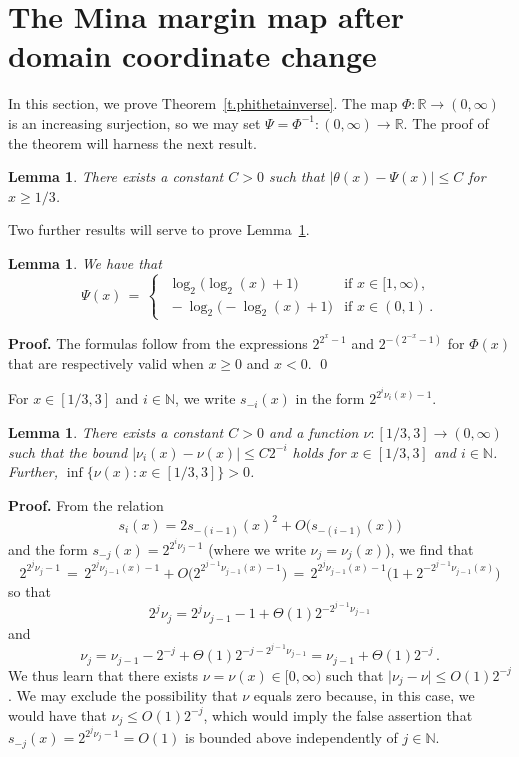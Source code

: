 \documentclass[letterpaper,11pt,oneside,reqno]{amsbook}
\newcommand{\N}{\ensuremath{\mathbb{N}}}
\newcommand{\R}{\ensuremath{\mathbb{R}}}
\numberwithin{figure}{chapter}
\newtheorem{lemma}[theorem]{Lemma}
\theoremstyle{definition}
\theoremstyle{definition}
\theoremstyle{definition}
\theoremstyle{definition}
\theoremstyle{definition}
\newcommand{\ceemack}{\nu}
\newcommand{\nwithzero}{\N}
\newcommand{\PhiMac}{\Phi}
\begin{document}
\section{The Mina margin map after domain coordinate change}\label{s.mmmtransform}
In this section, we prove Theorem~\ref{t.phithetainverse}.
The map  $\PhiMac:\R \to (0,\infty)$ is an increasing surjection, so we may set $\Psi = \PhiMac^{-1}:(0,\infty) \to \R$.
The proof of the theorem will harness the next result.
\begin{lemma}\label{l.thetapsi}
There exists a constant $C > 0$ such that $\vert \theta(x) - \Psi(x) \vert \leq C$ for $x \geq 1/3$.
\end{lemma}
Two further results will serve to prove Lemma~\ref{l.thetapsi}.
\begin{lemma}\label{l.psi}
We have that
$$ \Psi(x)\, = \, \begin{cases}
  \, \, \log_2 \big( \log_2(x) +1 \big)  &  \text{if $x \in [1,\infty)$} \, , \\
 \, \, - \log_2 \big( - \log_2(x) +1 \big)   &  \text{if $x \in (0,1)$} \, .
\end{cases}
$$
\end{lemma}
{\bf Proof.} The formulas follow from the expressions $2^{2^x - 1}$ and $2^{-(2^{-x} -1)}$ for $\PhiMac(x)$ that are respectively valid when $x \geq 0$ and $ x < 0$. \qed

For $x \in [1/3,3]$ and $i \in \nwithzero$, we write $s_{-i}(x)$ in the form $2^{2^i \ceemack_i(x) - 1}$.
\begin{lemma}\label{l.sminusi}
There exists a constant $C > 0$ and a function $\ceemack:[1/3,3] \to (0,\infty)$ such that the bound $\vert \ceemack_i(x) - \ceemack(x) \vert \leq C 2^{-i}$ holds for $x \in [1/3,3]$ and $i \in \nwithzero$. Further, $\inf \big\{ \ceemack(x): x \in [1/3,3] \big\} > 0$.
\end{lemma}
{\bf Proof.}
From the relation 
$$
s_i(x) = 2 s_{-(i-1)}(x)^2 + O \big( s_{-(i-1)}(x) \big)
$$
and the form $s_{-j}(x) = 2^{2^i \ceemack_j - 1}$ (where we write $\ceemack_j = \ceemack_j(x)$), we find that
$$
 2^{2^j \ceemack_j - 1} \, = \, 2^{2^j \ceemack_{j-1}(x) - 1} + O \big( 2^{2^{j-1} \ceemack_{j-1}(x) - 1} \big) \, = \,  2^{2^j \ceemack_{j-1}(x) - 1} \Big( 1+  2^{-2^{j-1} \ceemack_{j-1}(x)} \Big)
$$
so that
$$
2^j \ceemack_j = 2^j \ceemack_{j-1} - 1 + \Theta(1) 2^{-2^{j-1}\ceemack_{j-1}}
$$
and
$$
\ceemack_j = \ceemack_{j-1} - 2^{-j} + \Theta(1) 2^{-j - 2^{j-1}\ceemack_{j-1}} = \ceemack_{j-1} + \Theta(1) 2^{-j} \, .
$$
We thus learn that there exists $\ceemack = \ceemack(x) \in [0,\infty)$ such that $\vert \ceemack_j - \ceemack \vert \leq O(1) 2^{-j}$. We may exclude the possibility that $\ceemack$ equals zero because, in this case, we would have that $\ceemack_j \leq O(1) 2^{-j}$, which would imply the false assertion that $s_{-j}(x) = 2^{2^j \ceemack_j - 1} = O(1)$ is bounded above independently of $j \in \nwithzero$. 
\end{document}
